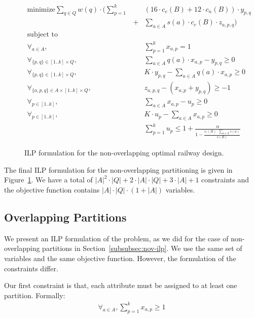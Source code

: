 \begin{figure}[!t]
\begin{eqnarray}
\text{minimize}  
    \sum_{q\in Q} w(q)\cdot \Big(\sum_{p=1}^{k} \!\!&&\!\! (16\cdot c_e(B) + 12\cdot c_n(B))\cdot y_{p,q}\nonumber\\
    &+& \sum_{a\in A} s(a)\cdot c_e(B)\cdot z_{a,p,q} \Big) \nonumber\\
\text{subject to}&&\nonumber\\
\forall_{a\in A}, 
    && \sum_{p=1}^{k} x_{a,p} = 1\nonumber\\
\forall_{\{p,q\}\in [1..k]\times Q}, 
    &&  \sum_{a\in A} q(a)\cdot x_{a,p} - y_{p,q} \geq 0 \nonumber\\
\forall_{\{p,q\}\in [1..k]\times Q}, 
    &&  K\cdot y_{p,q} - \sum_{a\in A} q(a)\cdot x_{a,p}  \geq 0 \nonumber\\
\forall_{\{a,p,q\}\in A\times [1..k]\times Q},
    && z_{a,p,q} - (x_{a,p} + y_{p,q}) \geq -1\nonumber\\
\forall_{p\in[1..k]},
    && \sum_{a\in A} x_{a,p} - u_p \geq 0 \nonumber\\
\forall_{p\in[1..k]},
    && K\cdot u_p - \sum_{a\in A} x_{a,p} \geq 0 \nonumber\\    
&& \sum_{p=1}^{k} u_p \leq 1 + \frac{\alpha}
  {1-\frac{c_e(B)\cdot \sum_{a\in A} s(a)}{s(B)}} \nonumber
\end{eqnarray}
\caption{ILP formulation for the non-overlapping optimal railway design.}
\label{fig:nov-ilp}
\end{figure}

The final ILP formulation for the non-overlapping partitioning is given in
Figure~\ref{fig:nov-ilp}. We have a total of $|A|^2\cdot|Q| +
2\cdot|A|\cdot|Q| + 3\cdot|A| + 1$ constraints and the objective function
contains $|A|\cdot|Q|\cdot(1+|A|)$ variables.

\subsection{Overlapping Partitions}\label{subsubsec:ov-ilp}
\noindent
We present an ILP formulation of the problem, as we did for the case of
non-overlapping partitions in Section~\ref{subsubsec:nov-ilp}. We use the same
set of variables and the same objective function. However, the formulation of
the constraints differ. 

Our first constraint is that, each attribute must be assigned to at least one
partition. Formally:
\begin{eqnarray}
\forall_{a\in A}, \sum_{p=1}^{k} x_{a,p} \geq 1
\end{eqnarray}

